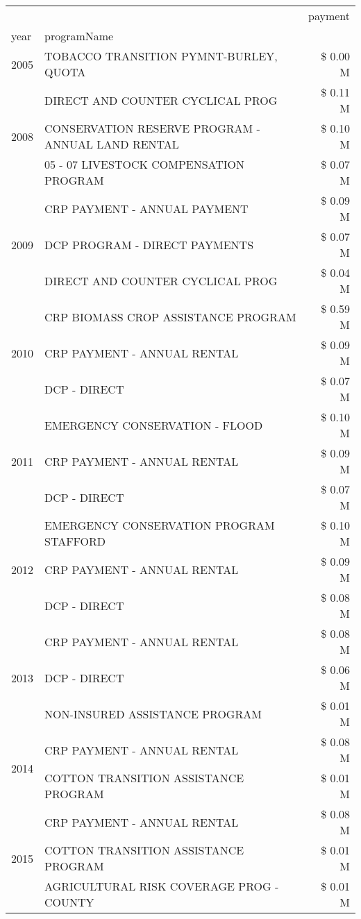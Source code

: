 \begin{tabular}{llr}
\toprule
 &  & payment \\
year & programName &  \\
\midrule
2005 & TOBACCO TRANSITION PYMNT-BURLEY, QUOTA & \$ 0.00 M \\
\cline{1-3}
\multirow[t]{3}{*}{2008} & DIRECT AND COUNTER CYCLICAL PROG & \$ 0.11 M \\
 & CONSERVATION RESERVE PROGRAM - ANNUAL LAND RENTAL & \$ 0.10 M \\
 & 05 - 07 LIVESTOCK COMPENSATION PROGRAM & \$ 0.07 M \\
\cline{1-3}
\multirow[t]{3}{*}{2009} & CRP PAYMENT - ANNUAL PAYMENT & \$ 0.09 M \\
 & DCP PROGRAM - DIRECT PAYMENTS & \$ 0.07 M \\
 & DIRECT AND COUNTER CYCLICAL PROG & \$ 0.04 M \\
\cline{1-3}
\multirow[t]{3}{*}{2010} & CRP BIOMASS CROP ASSISTANCE PROGRAM & \$ 0.59 M \\
 & CRP PAYMENT - ANNUAL RENTAL & \$ 0.09 M \\
 & DCP - DIRECT & \$ 0.07 M \\
\cline{1-3}
\multirow[t]{3}{*}{2011} & EMERGENCY CONSERVATION - FLOOD & \$ 0.10 M \\
 & CRP PAYMENT - ANNUAL RENTAL & \$ 0.09 M \\
 & DCP - DIRECT & \$ 0.07 M \\
\cline{1-3}
\multirow[t]{3}{*}{2012} & EMERGENCY CONSERVATION PROGRAM STAFFORD & \$ 0.10 M \\
 & CRP PAYMENT - ANNUAL RENTAL & \$ 0.09 M \\
 & DCP - DIRECT & \$ 0.08 M \\
\cline{1-3}
\multirow[t]{3}{*}{2013} & CRP PAYMENT - ANNUAL RENTAL & \$ 0.08 M \\
 & DCP - DIRECT & \$ 0.06 M \\
 & NON-INSURED ASSISTANCE PROGRAM & \$ 0.01 M \\
\cline{1-3}
\multirow[t]{2}{*}{2014} & CRP PAYMENT - ANNUAL RENTAL & \$ 0.08 M \\
 & COTTON TRANSITION ASSISTANCE PROGRAM & \$ 0.01 M \\
\cline{1-3}
\multirow[t]{3}{*}{2015} & CRP PAYMENT - ANNUAL RENTAL & \$ 0.08 M \\
 & COTTON TRANSITION ASSISTANCE PROGRAM & \$ 0.01 M \\
 & AGRICULTURAL RISK COVERAGE PROG - COUNTY & \$ 0.01 M \\

\end{tabular}
